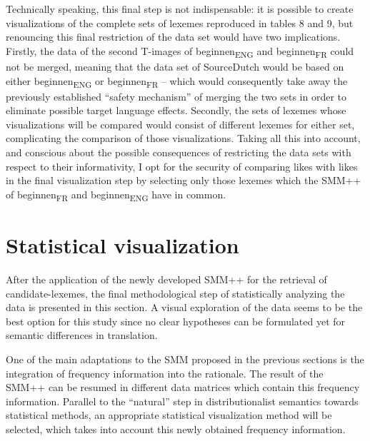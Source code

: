Technically speaking, this final step is not indispensable: it is possible to create visualizations of the complete sets of lexemes reproduced in tables 8 and 9, but renouncing this final restriction of the data set would have two implications. Firstly, the data of the second T-images of beginnen\textsubscript{ENG} and beginnen\textsubscript{FR} could not be merged, meaning that the data set of SourceDutch would be based on either beginnen\textsubscript{ENG} or beginnen\textsubscript{FR} – which would consequently take away the previously established ``safety mechanism'' of merging the two sets in order to eliminate possible target language effects. Secondly, the sets of lexemes whose visualizations will be compared would consist of different lexemes for either set, complicating the comparison of those visualizations. Taking all this into account, and conscious about the possible consequences of restricting the data sets with respect to their informativity, I opt for the security of comparing likes with likes in the final visualization step by selecting only those lexemes which the SMM++ of beginnen\textsubscript{FR} and beginnen\textsubscript{ENG} have in common.


\section{Statistical visualization}
\label{sec:3.7}  
After the application of the newly developed SMM++ for the retrieval of candidate-lexemes, the final methodological step of statistically analyzing the data is presented in this section. A visual exploration of the data seems to be the best option for this study since no clear hypotheses can be formulated yet for semantic differences in translation.

One of the main adaptations to the SMM proposed in the previous sections is the integration of frequency information into the rationale. The result of the SMM++ can be resumed in different data matrices which contain this frequency information. Parallel to the ``natural'' step in distributionalist semantics towards statistical methods, an appropriate statistical visualization method will be selected, which takes into account this newly obtained frequency information.

